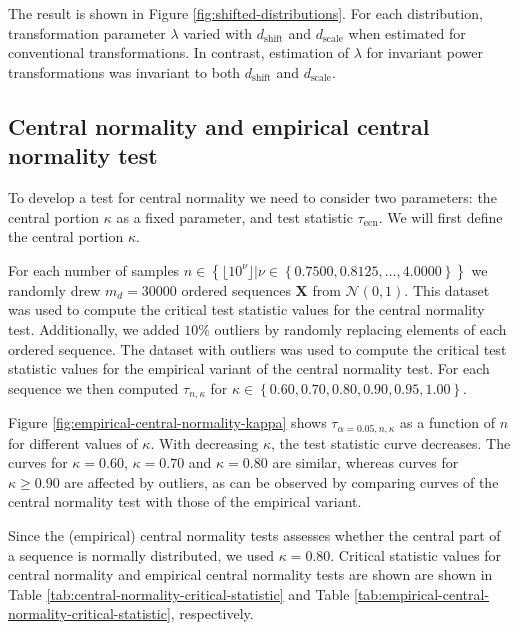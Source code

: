 \documentclass[
  a4paper,
]{article}
\begin{document}
The result is shown in Figure \ref{fig:shifted-distributions}. For each
distribution, transformation parameter \(\lambda\) varied with
\(d_{\text{shift}}\) and \(d_{\text{scale}}\) when estimated for
conventional transformations. In contrast, estimation of \(\lambda\) for
invariant power transformations was invariant to both
\(d_{\text{shift}}\) and \(d_{\text{scale}}\).

\subsection{Central normality and empirical central normality
test}\label{central-normality-and-empirical-central-normality-test}

To develop a test for central normality we need to consider two
parameters: the central portion \(\kappa\) as a fixed parameter, and
test statistic \(\tau_{\text{ecn}}\). We will first define the central
portion \(\kappa\).

For each number of samples
\(n \in \left\{\lfloor 10^\nu \rfloor | \nu \in \left\{0.7500, 0.8125, \ldots, 4.0000 \right \} \right\}\)
we randomly drew \(m_d = 30000\) ordered sequences \(\mathbf{X}\) from
\(\mathcal{N}(0,1)\). This dataset was used to compute the critical test
statistic values for the central normality test. Additionally, we added
\(10 \%\) outliers by randomly replacing elements of each ordered
sequence. The dataset with outliers was used to compute the critical
test statistic values for the empirical variant of the central normality
test. For each sequence we then computed \(\tau_{n, \kappa}\) for
\(\kappa \in \left\{0.60, 0.70, 0.80, 0.90, 0.95, 1.00\right\}\).

Figure \ref{fig:empirical-central-normality-kappa} shows
\(\tau_{\alpha = 0.05, n, \kappa}\) as a function of \(n\) for different
values of \(\kappa\). With decreasing \(\kappa\), the test statistic
curve decreases. The curves for \(\kappa = 0.60\), \(\kappa = 0.70\) and
\(\kappa = 0.80\) are similar, whereas curves for \(\kappa \geq 0.90\)
are affected by outliers, as can be observed by comparing curves of the
central normality test with those of the empirical variant.

Since the (empirical) central normality tests assesses whether the
central part of a sequence is normally distributed, we used
\(\kappa = 0.80\). Critical statistic values for central normality and
empirical central normality tests are shown are shown in Table
\ref{tab:central-normality-critical-statistic} and Table
\ref{tab:empirical-central-normality-critical-statistic}, respectively.
\end{document}
